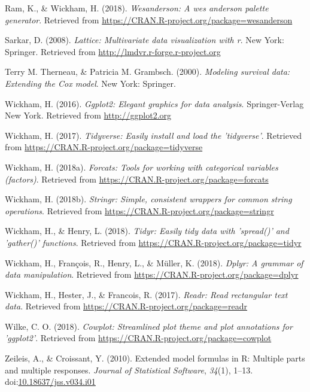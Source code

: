 \documentclass[man, fleqn, noextraspace]{apa6}
\theoremstyle{definition}
\theoremstyle{definition}
\theoremstyle{definition}
\theoremstyle{remark}
\begin{document}
\hypertarget{ref-R-wesanderson}{}
Ram, K., \& Wickham, H. (2018). \emph{Wesanderson: A wes anderson
palette generator}. Retrieved from
\url{https://CRAN.R-project.org/package=wesanderson}

\hypertarget{ref-R-lattice}{}
Sarkar, D. (2008). \emph{Lattice: Multivariate data visualization with
r}. New York: Springer. Retrieved from
\url{http://lmdvr.r-forge.r-project.org}

\hypertarget{ref-R-survival-book}{}
Terry M. Therneau, \& Patricia M. Grambsch. (2000). \emph{Modeling
survival data: Extending the Cox model}. New York: Springer.

\hypertarget{ref-R-ggplot2}{}
Wickham, H. (2016). \emph{Ggplot2: Elegant graphics for data analysis}.
Springer-Verlag New York. Retrieved from \url{http://ggplot2.org}

\hypertarget{ref-R-tidyverse}{}
Wickham, H. (2017). \emph{Tidyverse: Easily install and load the
'tidyverse'}. Retrieved from
\url{https://CRAN.R-project.org/package=tidyverse}

\hypertarget{ref-R-forcats}{}
Wickham, H. (2018a). \emph{Forcats: Tools for working with categorical
variables (factors)}. Retrieved from
\url{https://CRAN.R-project.org/package=forcats}

\hypertarget{ref-R-stringr}{}
Wickham, H. (2018b). \emph{Stringr: Simple, consistent wrappers for
common string operations}. Retrieved from
\url{https://CRAN.R-project.org/package=stringr}

\hypertarget{ref-R-tidyr}{}
Wickham, H., \& Henry, L. (2018). \emph{Tidyr: Easily tidy data with
'spread()' and 'gather()' functions}. Retrieved from
\url{https://CRAN.R-project.org/package=tidyr}

\hypertarget{ref-R-dplyr}{}
Wickham, H., François, R., Henry, L., \& Müller, K. (2018). \emph{Dplyr:
A grammar of data manipulation}. Retrieved from
\url{https://CRAN.R-project.org/package=dplyr}

\hypertarget{ref-R-readr}{}
Wickham, H., Hester, J., \& Francois, R. (2017). \emph{Readr: Read
rectangular text data}. Retrieved from
\url{https://CRAN.R-project.org/package=readr}

\hypertarget{ref-R-cowplot}{}
Wilke, C. O. (2018). \emph{Cowplot: Streamlined plot theme and plot
annotations for 'ggplot2'}. Retrieved from
\url{https://CRAN.R-project.org/package=cowplot}

\hypertarget{ref-R-Formula}{}
Zeileis, A., \& Croissant, Y. (2010). Extended model formulas in R:
Multiple parts and multiple responses. \emph{Journal of Statistical
Software}, \emph{34}(1), 1--13.
doi:\href{https://doi.org/10.18637/jss.v034.i01}{10.18637/jss.v034.i01}

\endgroup
\end{document}
